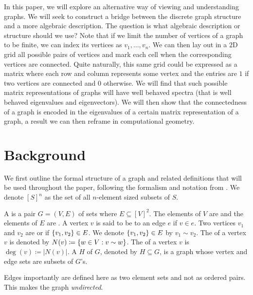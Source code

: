 \documentclass[11pt]{article}
\begin{document}
In this paper, we will explore an alternative way of viewing and understanding graphs. We will seek to construct a bridge between the discrete graph structure and a more algebraic description. The question is what algebraic description or structure should we use? Note that if we limit the number of vertices of a graph to be finite, we can index its vertices as $v_1, \ldots, v_n$. We can then lay out in a $2$D grid all possible pairs of vertices and mark each cell when the corresponding vertices are connected. Quite naturally, this same grid could be expressed as a matrix where each row and column represents some vertex and the entries are $1$ if two vertices are connected and $0$ otherwise. We will find that such possible matrix representations of graphs will have well behaved spectra (that is well behaved eigenvalues and eigenvectors). We will then show that the connectedness of a graph is encoded in the eigenvalues of a certain matrix representation of a graph, a result we can then reframe in computational geometry.

\section{Background}

We first outline the formal structure of a graph and related definitions that will be used throughout the paper, following the formalism and notation from \cite{diestelGraphTheory2017}. We denote $[S]^n$ as the set of all $n$-element sized subsets of $S$.

\begin{definition}
    A  is a pair $G = (V, E)$ of sets where $E \subseteq [V]^2$. The elements of $V$ are  and the elements of $E$ are . A vertex $v$ is said to be  to an edge $e$ if $v \in e$. Two vertices $v_1$ and $v_2$ are  or  if $\qty{v_1, v_2} \in E$. We denote $\qty{v_1, v_2} \in E$ by $v_1 \sim v_2$. The  of a vertex $v$ is denoted by $N(v) \coloneq \qty{w \in V : v \sim w}$. The  of a vertex $v$ is $\deg(v) \coloneq |N(v)|$. A  $H$ of $G$, denoted by $H \subseteq G$, is a graph whose vertex and edge sets are subsets of $G$'s.
\end{definition}

\begin{remark}
    Edges importantly are defined here as two element sets and not as ordered pairs. This makes the graph \textit{undirected}.
\end{remark}
\end{document}
